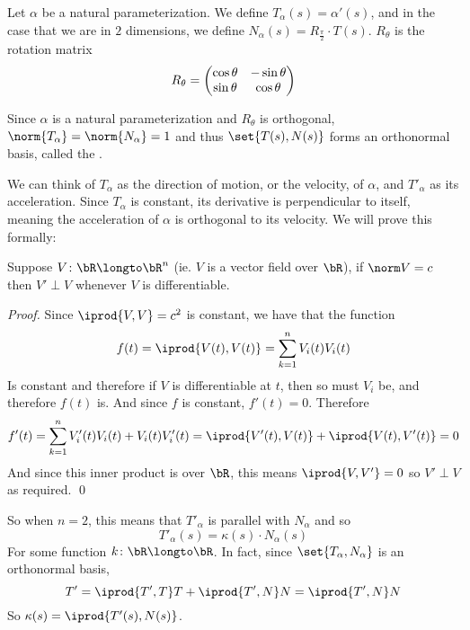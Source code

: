 \begin{defn*}

    Let $\alpha$ be a natural parameterization.
    We define $T_\alpha(s)=\alpha'(s)$, and in the case that we are in $2$ dimensions, we define $N_\alpha(s)=R_{\frac\pi2}\cdot T(s)$.
    $R_\theta$ is the rotation matrix
    \[ R_\theta = \begin{pmatrix}\cos\theta & -\sin\theta \\ \sin\theta & \cos\theta\end{pmatrix} \]

    Since $\alpha$ is a natural parameterization and $R_\theta$ is orthogonal, $\norm{T_\alpha}=\norm{N_\alpha}=1$ and thus $\set{T(s),N(s)}$ forms an orthonormal basis, called the
    .

\end{defn*}

We can think of $T_\alpha$ as the direction of motion, or the velocity, of $\alpha$, and $T'_\alpha$ as its acceleration.
Since $T_\alpha$ is constant, its derivative is perpendicular to itself, meaning the acceleration of $\alpha$ is orthogonal to its velocity.
We will prove this formally:

\begin{prop*}[constVecField]

    Suppose $V\colon\bR\longto\bR^n$ (ie. $V$ is a vector field over $\bR$), if $\norm V=c$ then $V'\perp V$ whenever $V$ is differentiable.

\end{prop*}

\begin{proof}

    Since $\iprod{V,V}=c^2$ is constant, we have that the function
    \[ f(t) = \iprod{V(t),V(t)} = \sum_{k=1}^n V_i(t)V_i(t) \]
    Is constant and therefore if $V$ is differentiable at $t$, then so must $V_i$ be, and therefore $f(t)$ is.
    And since $f$ is constant, $f'(t)=0$.
    Therefore
    \[ f'(t) = \sum_{k=1}^n V_i'(t)V_i(t) + V_i(t)V_i'(t) = \iprod{V'(t),V(t)} + \iprod{V(t),V'(t)} = 0 \]
    And since this inner product is over $\bR$, this means $\iprod{V,V'}=0$ so $V'\perp V$ as required.
    \qed

\end{proof}

So when $n=2$, this means that $T'_\alpha$ is parallel with $N_\alpha$ and so
\[ T'_\alpha(s) = \kappa(s)\cdot N_\alpha(s) \]
For some function $k\colon\bR\longto\bR$.
In fact, since $\set{T_\alpha,N_\alpha}$ is an orthonormal basis,
\[ T' = \iprod{T',T}T + \iprod{T',N}N = \iprod{T',N}N \]
So $\kappa(s)=\iprod{T'(s),N(s)}$.

